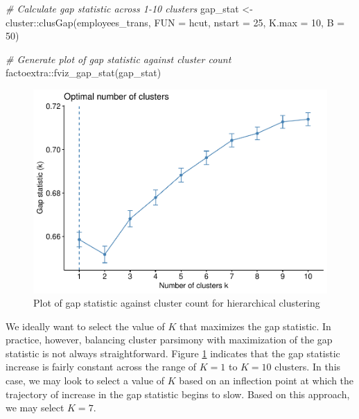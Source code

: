 \documentclass[
]{book}
\newenvironment{Shaded}{\begin{snugshade}}{\end{snugshade}}
\newcommand{\AttributeTok}[1]{\textcolor[rgb]{0.77,0.63,0.00}{#1}}
\newcommand{\CommentTok}[1]{\textcolor[rgb]{0.56,0.35,0.01}{\textit{#1}}}
\newcommand{\DecValTok}[1]{\textcolor[rgb]{0.00,0.00,0.81}{#1}}
\newcommand{\FunctionTok}[1]{\textcolor[rgb]{0.00,0.00,0.00}{#1}}
\newcommand{\NormalTok}[1]{#1}
\newcommand{\OtherTok}[1]{\textcolor[rgb]{0.56,0.35,0.01}{#1}}
\newcommand{\SpecialCharTok}[1]{\textcolor[rgb]{0.00,0.00,0.00}{#1}}
\begin{document}
\begin{Shaded}
\begin{Highlighting}[]
\CommentTok{\# Calculate gap statistic across 1{-}10 clusters}
\NormalTok{gap\_stat }\OtherTok{\textless{}{-}}\NormalTok{ cluster}\SpecialCharTok{::}\FunctionTok{clusGap}\NormalTok{(employees\_trans, }\AttributeTok{FUN =}\NormalTok{ hcut, }\AttributeTok{nstart =} \DecValTok{25}\NormalTok{, }\AttributeTok{K.max =} \DecValTok{10}\NormalTok{, }\AttributeTok{B =} \DecValTok{50}\NormalTok{)}

\CommentTok{\# Generate plot of gap statistic against cluster count}
\NormalTok{factoextra}\SpecialCharTok{::}\FunctionTok{fviz\_gap\_stat}\NormalTok{(gap\_stat)}
\end{Highlighting}
\end{Shaded}

\begin{figure}

{\centering \includegraphics[width=1\linewidth]{The_Fundamentals_of_People_Analytics_files/figure-latex/hclust-gap-stat-1} 

}

\caption{Plot of gap statistic against cluster count for hierarchical clustering}\label{fig:hclust-gap-stat}
\end{figure}

We ideally want to select the value of \(K\) that maximizes the gap statistic. In practice, however, balancing cluster parsimony with maximization of the gap statistic is not always straightforward. Figure \ref{fig:hclust-gap-stat} indicates that the gap statistic increase is fairly constant across the range of \(K = 1\) to \(K = 10\) clusters. In this case, we may look to select a value of \(K\) based on an inflection point at which the trajectory of increase in the gap statistic begins to slow. Based on this approach, we may select \(K = 7\).
\end{document}
